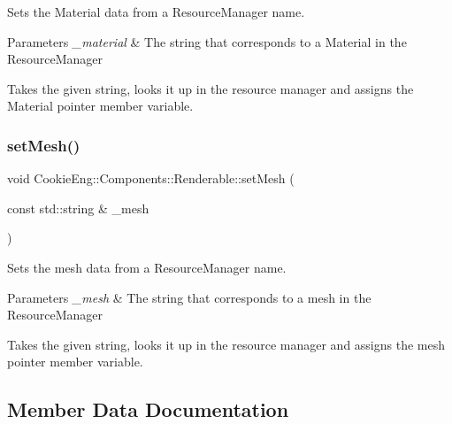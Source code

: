 Sets the Material data from a Resource\+Manager name. 


\begin{DoxyParams}{Parameters}
{\em \+\_\+material} & The string that corresponds to a Material in the Resource\+Manager\\
\hline
\end{DoxyParams}
Takes the given string, looks it up in the resource manager and assigns the Material pointer member variable. \mbox{\label{class_cookie_eng_1_1_components_1_1_renderable_a4b9903e0bfb81ec574d022d7b2c198af}} 
\subsubsection{\texorpdfstring{set\+Mesh()}{setMesh()}}
{\footnotesize\ttfamily void Cookie\+Eng\+::\+Components\+::\+Renderable\+::set\+Mesh (\begin{DoxyParamCaption}\item[{const std\+::string \&}]{\+\_\+mesh }\end{DoxyParamCaption})}



Sets the mesh data from a Resource\+Manager name. 


\begin{DoxyParams}{Parameters}
{\em \+\_\+mesh} & The string that corresponds to a mesh in the Resource\+Manager\\
\hline
\end{DoxyParams}
Takes the given string, looks it up in the resource manager and assigns the mesh pointer member variable. 

\subsection{Member Data Documentation}
\mbox{\label{class_cookie_eng_1_1_components_1_1_renderable_a69e36f6c8b8d58c978d86f2591c53ec5}} 

